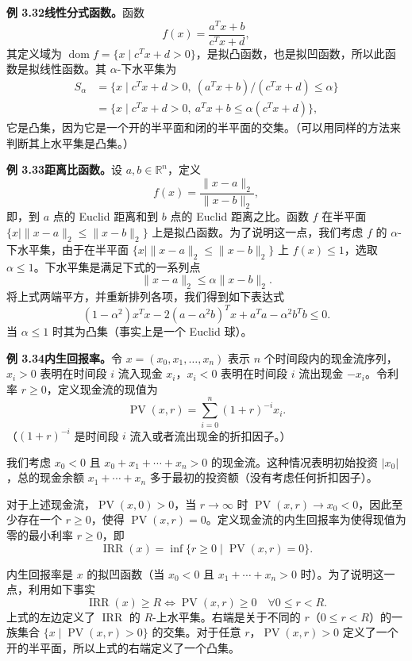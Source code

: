 \documentclass[UTF8,12pt,a4paper,fontset=fandol]{ctexart}
\DeclareMathOperator{\dom}{dom}
\begin{document}
\noindent\textbf{例 3.32\quad 线性分式函数。}\quad 函数
\[
f(x)=\frac{a^Tx+b}{c^Tx+d},
\]
其定义域为 $\dom f=\{x\mid c^Tx+d>0\}$，是拟凸函数，也是拟凹函数，所以此函数是拟线性函数。其 $\alpha$-下水平集为
\[
\begin{aligned}
S_\alpha
&=\{x\mid c^Tx+d>0,\ (a^Tx+b)/(c^Tx+d)\leq\alpha\}\\
&=\{x\mid c^Tx+d>0,\ a^Tx+b\leq\alpha(c^Tx+d)\},
\end{aligned}
\]
它是凸集，因为它是一个开的半平面和闭的半平面的交集。（可以用同样的方法来判断其上水平集是凸集。）

\noindent\textbf{例 3.33\quad 距离比函数。}\quad 设 $a,b\in\mathbb{R}^n$，定义
\[
f(x)=\frac{\|x-a\|_2}{\|x-b\|_2},
\]
即，到 $a$ 点的 Euclid 距离和到 $b$ 点的 Euclid 距离之比。函数 $f$ 在半平面 $\{x\mid \|x-a\|_2\leq\|x-b\|_2\}$ 上是拟凸函数。为了说明这一点，我们考虑 $f$ 的 $\alpha$-下水平集，由于在半平面 $\{x\mid \|x-a\|_2\leq\|x-b\|_2\}$ 上 $f(x)\leq1$，选取 $\alpha\leq1$。下水平集是满足下式的一系列点
\[
\|x-a\|_2\leq\alpha\|x-b\|_2.
\]
将上式两端平方，并重新排列各项，我们得到如下表达式
\[
(1-\alpha^2)x^Tx-2(a-\alpha^2b)^Tx+a^Ta-\alpha^2b^Tb\leq0.
\]
当 $\alpha\leq1$ 时其为凸集（事实上是一个 Euclid 球）。

\noindent\textbf{例 3.34\quad 内生回报率。}\quad 令 $x=(x_0,x_1,\ldots,x_n)$ 表示 $n$ 个时间段内的现金流序列，$x_i>0$ 表明在时间段 $i$ 流入现金 $x_i$，$x_i<0$ 表明在时间段 $i$ 流出现金 $-x_i$。令利率 $r\geq0$，定义现金流的现值为
\[
\operatorname{PV}(x,r)=\sum_{i=0}^n(1+r)^{-i}x_i.
\]
（$(1+r)^{-i}$ 是时间段 $i$ 流入或者流出现金的折扣因子。）

我们考虑 $x_0<0$ 且 $x_0+x_1+\cdots+x_n>0$ 的现金流。这种情况表明初始投资 $|x_0|$，总的现金余额 $x_1+\cdots+x_n$ 多于最初的投资额（没有考虑任何折扣因子）。

对于上述现金流，$\operatorname{PV}(x,0)>0$，当 $r\to\infty$ 时 $\operatorname{PV}(x,r)\to x_0<0$，因此至少存在一个 $r\geq0$，使得 $\operatorname{PV}(x,r)=0$。定义现金流的内生回报率为使得现值为零的最小利率 $r\geq0$，即
\[
\operatorname{IRR}(x)=\inf\{r\geq0\mid \operatorname{PV}(x,r)=0\}.
\]

内生回报率是 $x$ 的拟凹函数（当 $x_0<0$ 且 $x_1+\cdots+x_n>0$ 时）。为了说明这一点，利用如下事实
\[
\operatorname{IRR}(x)\geq R\Longleftrightarrow \operatorname{PV}(x,r)\geq0\quad \forall 0\leq r<R.
\]
上式的左边定义了 $\operatorname{IRR}$ 的 $R$-上水平集。右端是关于不同的 $r$（$0\leq r<R$）的一族集合 $\{x\mid \operatorname{PV}(x,r)>0\}$ 的交集。对于任意 $r$，$\operatorname{PV}(x,r)>0$ 定义了一个开的半平面，所以上式的右端定义了一个凸集。
\end{document}
